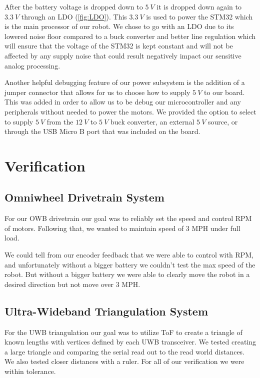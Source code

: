 \documentclass{report}
\begin{document}
    After the battery voltage is dropped down to $5~V$ it is dropped down again to $3.3~V$ through an LDO (\ref{fig:LDO}). This $3.3~V$ is used to power the STM32 which is the main processor of our robot. We chose to go with an LDO due to its lowered noise floor compared to a buck converter and better line regulation which will ensure that the voltage of the STM32 is kept constant and will not be affected by any supply noise that could result negatively impact our sensitive analog processing.

    Another helpful debugging feature of our power subsystem is the addition of a jumper connector that allows for us to choose how to supply $5~V$ to our board. This was added in order to allow us to be debug our microcontroller and any peripherals without needed to power the motors. We provided the option to select to supply $5~V$ from the $12~V$ to $5~V$ buck converter, an external $5~V$ source, or through the USB Micro B port that was included on the board.

    \chapter{Verification}

    \section{Omniwheel Drivetrain System}
    For our OWB drivetrain our goal was to reliably set the speed and control RPM of motors. Following that, we wanted to maintain speed of 3 MPH under full load.

    We could tell from our encoder feedback that we were able to control with RPM, and unfortunately without a bigger battery we couldn't test the max speed of the robot. But without a bigger battery we were able to clearly move the robot in a desired direction but not move over 3 MPH.

    \section{Ultra-Wideband Triangulation System}
    For the UWB triangulation our goal was to utilize ToF to create a triangle of known lengths with vertices defined by each UWB transceiver. We tested creating a large triangle and comparing the serial read out to the read world distances. We also tested closer distances with a ruler. For all of our verification we were within tolerance.
    
\end{document}
